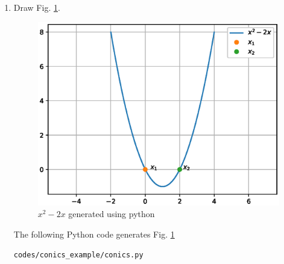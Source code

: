 \renewcommand{\theequation}{\theenumi}
\begin{enumerate}[label=\thesubsection.\arabic*.,ref=\thesubsection.\theenumi]

\item Draw Fig. \ref{fig:quadeq_conics_example}.

\begin{figure}[!ht]
\centering
\includegraphics[width=\columnwidth]{./figs/conics_example/quadratic_equation.eps}
\caption{$x^2 -2x$ generated using python}
\label{fig:quadeq_conics_example}
\end{figure} 

\solution The  following Python code generates Fig. \ref{fig:quadeq_conics_example}

\begin{lstlisting}
codes/conics_example/conics.py
\end{lstlisting}
\end{enumerate}

